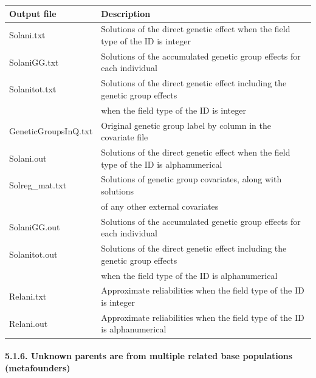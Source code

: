 {\def\LTcaptype{none} %
\begin{longtable}[]{@{}
  >{\raggedright\arraybackslash}p{}
  >{\raggedright\arraybackslash}p{}@{}}
\toprule\noalign{}
\begin{minipage}[b]{\linewidth}\raggedright
Output file
\end{minipage} & \begin{minipage}[b]{\linewidth}\raggedright
Description
\end{minipage} \\
\midrule\noalign{}
\endhead
\bottomrule\noalign{}
\endlastfoot
Solani.txt & Solutions of the direct genetic effect when the field type
of the ID is integer \\
SolaniGG.txt & Solutions of the accumulated genetic group effects for
each individual \\
Solanitot.txt & Solutions of the direct genetic effect including the
genetic group effects \\
& when the field type of the ID is integer \\
GeneticGroupsInQ.txt & Original genetic group label by column in the
covariate file \\
Solani.out & Solutions of the direct genetic effect when the field type
of the ID is alphanumerical \\
Solreg\_mat.txt & Solutions of genetic group covariates, along with
solutions \\
& of any other external covariates \\
SolaniGG.out & Solutions of the accumulated genetic group effects for
each individual \\
Solanitot.out & Solutions of the direct genetic effect including the
genetic group effects \\
& when the field type of the ID is alphanumerical \\
Relani.txt & Approximate reliabilities when the field type of the ID is
integer \\
Relani.out & Approximate reliabilities when the field type of the ID is
alphanumerical \\
\end{longtable}
}

\paragraph{5.1.6. Unknown parents are from multiple related base
populations (metafounders)}\label{Gene18}

